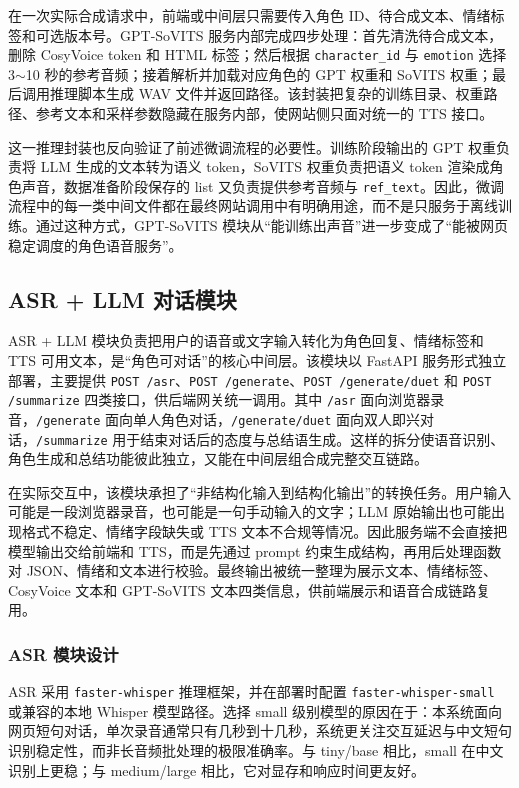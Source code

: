 \documentclass[12pt,a4paper]{article}
\begin{document}
在一次实际合成请求中，前端或中间层只需要传入角色 ID、待合成文本、情绪标签和可选版本号。GPT-SoVITS 服务内部完成四步处理：首先清洗待合成文本，删除 CosyVoice token 和 HTML 标签；然后根据 \texttt{character\_id} 与 \texttt{emotion} 选择 3$\sim$10 秒的参考音频；接着解析并加载对应角色的 GPT 权重和 SoVITS 权重；最后调用推理脚本生成 WAV 文件并返回路径。该封装把复杂的训练目录、权重路径、参考文本和采样参数隐藏在服务内部，使网站侧只面对统一的 TTS 接口。

这一推理封装也反向验证了前述微调流程的必要性。训练阶段输出的 GPT 权重负责将 LLM 生成的文本转为语义 token，SoVITS 权重负责把语义 token 渲染成角色声音，数据准备阶段保存的 list 又负责提供参考音频与 \texttt{ref\_text}。因此，微调流程中的每一类中间文件都在最终网站调用中有明确用途，而不是只服务于离线训练。通过这种方式，GPT-SoVITS 模块从“能训练出声音”进一步变成了“能被网页稳定调度的角色语音服务”。

\subsection{ASR + LLM 对话模块}
\label{sec:asr-llm}

ASR + LLM 模块负责把用户的语音或文字输入转化为角色回复、情绪标签和 TTS 可用文本，是“角色可对话”的核心中间层。该模块以 FastAPI 服务形式独立部署，主要提供 \texttt{POST /asr}、\texttt{POST /generate}、\texttt{POST /generate/duet} 和 \texttt{POST /summarize} 四类接口，供后端网关统一调用。其中 \texttt{/asr} 面向浏览器录音，\texttt{/generate} 面向单人角色对话，\texttt{/generate/duet} 面向双人即兴对话，\texttt{/summarize} 用于结束对话后的态度与总结语生成。这样的拆分使语音识别、角色生成和总结功能彼此独立，又能在中间层组合成完整交互链路。

在实际交互中，该模块承担了“非结构化输入到结构化输出”的转换任务。用户输入可能是一段浏览器录音，也可能是一句手动输入的文字；LLM 原始输出也可能出现格式不稳定、情绪字段缺失或 TTS 文本不合规等情况。因此服务端不会直接把模型输出交给前端和 TTS，而是先通过 prompt 约束生成结构，再用后处理函数对 JSON、情绪和文本进行校验。最终输出被统一整理为展示文本、情绪标签、CosyVoice 文本和 GPT-SoVITS 文本四类信息，供前端展示和语音合成链路复用。

\subsubsection{ASR 模块设计}

ASR 采用 \texttt{faster-whisper} 推理框架，并在部署时配置 \texttt{faster-whisper-small} 或兼容的本地 Whisper 模型路径。选择 small 级别模型的原因在于：本系统面向网页短句对话，单次录音通常只有几秒到十几秒，系统更关注交互延迟与中文短句识别稳定性，而非长音频批处理的极限准确率。与 tiny/base 相比，small 在中文识别上更稳；与 medium/large 相比，它对显存和响应时间更友好。
\end{document}

